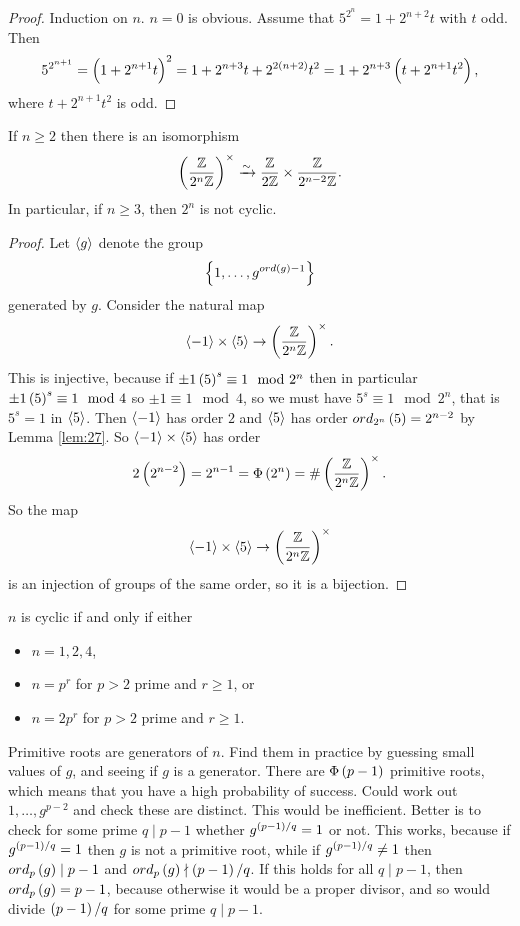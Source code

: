 \begin{proof}
Induction on $ n $. $ n = 0 $ is obvious. Assume that $ 5^{2^n} = 1 + 2^{n + 2}t $ with $ t $ odd. Then
$$ 5^{2^{n + 1}} = \br{1 + 2^{n + 1}t}^2 = 1 + 2^{n + 3}t + 2^{2\br{n + 2}}t^2 = 1 + 2^{n + 3}\br{t + 2^{n + 1}t^2}, $$
where $ t + 2^{n + 1}t^2 $ is odd.
\end{proof}

\begin{proposition}
If $ n \ge 2 $ then there is an isomorphism
$$ \Unit{2^n} \xrightarrow{\sim} \dfrac{\Z}{2\Z} \times \dfrac{\Z}{2^{n - 2}\Z}. $$
In particular, if $ n \ge 3 $, then $ \unit{2^n} $ is not cyclic.
\end{proposition}

\begin{proof}
Let $ \left\langle g \right\rangle $ denote the group
$$ \cbr{1, \dots, g^{ord\br{g} - 1}} $$
generated by $ g $. Consider the natural map
$$ \abr{-1} \times \abr{5} \to \Unit{2^n}. $$
This is injective, because if $ \pm 1\br{5}^s \equiv 1 \mod 2^n $ then in particular $ \pm 1\br{5}^s \equiv 1 \mod 4 $ so $ \pm 1 \equiv 1 \mod 4 $, so we must have $ 5^s \equiv 1 \mod 2^n $, that is $ 5^s = 1 $ in $ \left\langle 5 \right\rangle $. Then $ \left\langle -1 \right\rangle $ has order $ 2 $ and $ \left\langle 5 \right\rangle $ has order $ ord_{2^n}\br{5} = 2^{n - 2} $ by Lemma \ref{lem:27}. So $ \left\langle -1 \right\rangle \times \left\langle 5 \right\rangle $ has order
$$ 2\br{2^{n - 2}} = 2^{n - 1} = \Phi\br{2^n} = \#\Unit{2^n}. $$
So the map
$$ \abr{-1} \times \abr{5} \to \Unit{2^n} $$
is an injection of groups of the same order, so it is a bijection.
\end{proof}

\begin{theorem}
$ \unit{n} $ is cyclic if and only if either
\begin{itemize}
\item $ n = 1, 2, 4 $,
\item $ n = p^r $ for $ p > 2 $ prime and $ r \ge 1 $, or
\item $ n = 2p^r $ for $ p > 2 $ prime and $ r \ge 1 $.
\end{itemize}
\end{theorem}


Primitive roots are generators of $ \unit{n} $. Find them in practice by guessing small values of $ g $, and seeing if $ g $ is a generator. There are $ \Phi\br{p - 1} $ primitive roots, which means that you have a high probability of success. Could work out $ 1, \dots, g^{p - 2} $ and check these are distinct. This would be inefficient. Better is to check for some prime $ q \mid p - 1 $ whether $ g^{\br{p - 1} / q} = 1 $ or not. This works, because if $ g^{\br{p - 1} / q} = 1 $ then $ g $ is not a primitive root, while if $ g^{\br{p - 1} / q} \ne 1 $ then $ ord_p\br{g} \mid p - 1 $ and $ ord_p\br{g} \nmid \br{p - 1} / q $. If this holds for all $ q \mid p - 1 $, then $ ord_p\br{g} = p - 1 $, because otherwise it would be a proper divisor, and so would divide $ \br{p - 1} / q $ for some prime $ q \mid p - 1 $.

